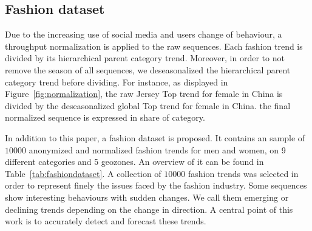 \documentclass{article} %
\newcommand{\numberts}{10000}
\begin{document}
\subsection{Fashion dataset}

Due to the increasing use of social media and users change of behaviour, a throughput normalization is applied to the raw sequences. Each fashion trend is divided by its hierarchical parent category trend. Moreover, in order to not remove the season of all sequences, we deseasonalized the hierarchical parent category trend before dividing. For instance, as displayed in Figure~\ref{fig:normalization}, the raw Jersey Top trend for female in China is divided by the deseasonalized global Top trend for female in China. the final normalized sequence is expressed in share of category.

In addition to this paper, a fashion dataset is proposed. It contains an sample of $\numberts$ anonymized and  normalized fashion trends for men and women, on 9 different categories and 5 geozones. An overview of it can be found in Table~\ref{tab:fashiondataset}. A collection of $\numberts$ fashion trends was selected in order to represent finely the issues faced by the fashion industry. Some sequences show interesting behaviours with sudden changes. We call them emerging or declining trends depending on the change in direction. A central point of this work is to accurately detect and forecast these trends.

%
\end{document}
